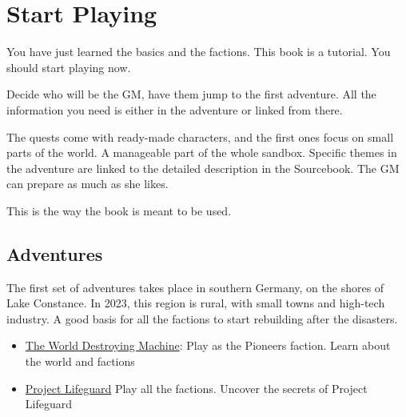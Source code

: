 \chapter{Start Playing}

You have just learned the basics and the factions. This book is a tutorial. You should start playing now.

Decide who will be the GM, have them jump to the first adventure. All the information you need is either in the adventure or linked from there.

The quests come with ready-made characters, and the first ones focus on small parts of the world. A manageable part of the whole sandbox.
Specific themes in the adventure are linked to the detailed description in the Sourcebook. The GM can prepare as much as she likes.

This is the way the book is meant to be used.

\section{Adventures}

The first set of adventures takes place in southern Germany, on the shores of Lake Constance. In 2023, this region is rural, with small towns and high-tech industry. A good basis for all the factions to start rebuilding after the disasters.
\begin{itemize}
\item \hyperref[ch:the world destroying machine]{The World Destroying Machine}: Play as the Pioneers faction. Learn about the world and factions
\item \hyperref[ch:project lifeguard]{Project Lifeguard} Play all the factions. Uncover the secrets of Project Lifeguard
\end{itemize}